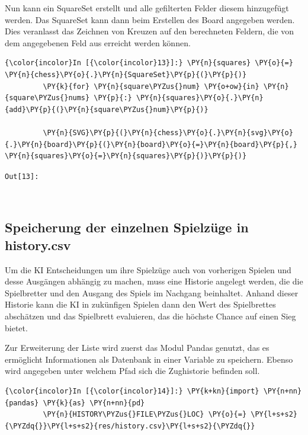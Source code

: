     Nun kann ein SquareSet erstellt und alle gefilterten Felder diesem
hinzugefügt werden. Das SquareSet kann dann beim Erstellen des Board
angegeben werden. Dies veranlasst das Zeichnen von Kreuzen auf den
berechneten Feldern, die von dem angegebenen Feld aus erreicht werden
können.

    \begin{Verbatim}[commandchars=\\\{\}]
{\color{incolor}In [{\color{incolor}13}]:} \PY{n}{squares} \PY{o}{=} \PY{n}{chess}\PY{o}{.}\PY{n}{SquareSet}\PY{p}{(}\PY{p}{)}
         \PY{k}{for} \PY{n}{square\PYZus{}num} \PY{o+ow}{in} \PY{n}{square\PYZus{}nums} \PY{p}{:} \PY{n}{squares}\PY{o}{.}\PY{n}{add}\PY{p}{(}\PY{n}{square\PYZus{}num}\PY{p}{)}
         
         \PY{n}{SVG}\PY{p}{(}\PY{n}{chess}\PY{o}{.}\PY{n}{svg}\PY{o}{.}\PY{n}{board}\PY{p}{(}\PY{n}{board}\PY{o}{=}\PY{n}{board}\PY{p}{,} \PY{n}{squares}\PY{o}{=}\PY{n}{squares}\PY{p}{)}\PY{p}{)}
\end{Verbatim}

\texttt{\color{outcolor}Out[{\color{outcolor}13}]:}
    
    \begin{center}
    \end{center}
    { \hspace*{\fill} \\}
    

    \subsection{Speicherung der einzelnen Spielzüge in
history.csv}\label{speicherung-der-einzelnen-spielzuxfcge-in-history.csv}

Um die KI Entscheidungen um ihre Spielzüge auch von vorherigen Spielen
und desse Ausgängen abhängig zu machen, muss eine Historie angelegt
werden, die die Spielbretter und den Ausgang des Spiels im Nachgang
beinhaltet. Anhand dieser Historie kann die KI in zukünfigen Spielen
dann den Wert des Spielbrettes abschätzen und das Spielbrett evaluieren,
das die höchste Chance auf einen Sieg bietet.

Zur Erweiterung der Liste wird zuerst das Modul Pandas genutzt, das es
ermöglicht Informationen als Datenbank in einer Variable zu speichern.
Ebenso wird angegeben unter welchem Pfad sich die Zughistorie befinden
soll.

    \begin{Verbatim}[commandchars=\\\{\}]
{\color{incolor}In [{\color{incolor}14}]:} \PY{k+kn}{import} \PY{n+nn}{pandas} \PY{k}{as} \PY{n+nn}{pd}
         \PY{n}{HISTORY\PYZus{}FILE\PYZus{}LOC} \PY{o}{=} \PY{l+s+s2}{\PYZdq{}}\PY{l+s+s2}{res/history.csv}\PY{l+s+s2}{\PYZdq{}}
\end{Verbatim}


